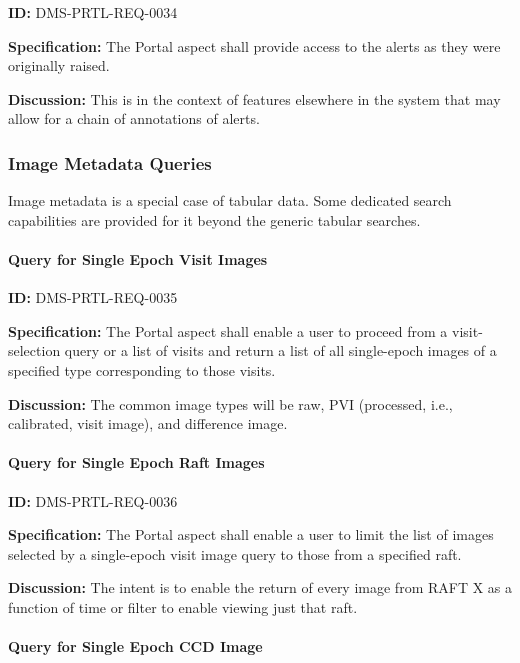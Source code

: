 \documentclass[SE,toc,lsstdraft]{lsstdoc}
\begin{document}
\label{DMS-PRTL-REQ-0034}
\textbf{ID:} DMS-PRTL-REQ-0034

\textbf{Specification:}
The Portal aspect shall provide access to the alerts as they were originally raised.

\textbf{Discussion:}
This is in the context of features elsewhere in the system that may allow for a chain of annotations of alerts.

\subsubsection{Image Metadata Queries}

Image metadata is a special case of tabular data.  Some dedicated search capabilities are provided for it beyond the generic tabular searches.

\paragraph{Query for Single Epoch Visit Images}\hfill  %

\label{DMS-PRTL-REQ-0035}
\textbf{ID:} DMS-PRTL-REQ-0035

\textbf{Specification:}
The Portal aspect shall enable a user to proceed from a visit-selection query or a list of visits and return a list of all single-epoch images of a specified type corresponding to those visits.

\textbf{Discussion:}
The common image types will be raw, PVI (processed, i.e., calibrated, visit image), and difference image.

\paragraph{Query for Single Epoch Raft Images}\hfill  %

\label{DMS-PRTL-REQ-0036}
\textbf{ID:} DMS-PRTL-REQ-0036

\textbf{Specification:}
The Portal aspect shall enable a user to limit the list of images selected by a single-epoch visit image query to those from a specified raft.

\textbf{Discussion:}
The intent is to enable the return of every image from RAFT X as a function of time or filter to enable viewing just that raft.

\paragraph{Query for Single Epoch CCD Image}\hfill  %
\end{document}
